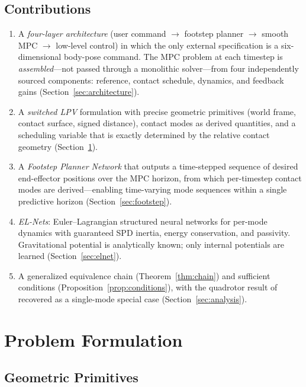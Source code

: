 \documentclass[letterpaper, 10pt, conference]{IEEEtran}
\begin{document}
\subsection*{Contributions}
\begin{enumerate}
  \item A \emph{four-layer architecture} (user command $\to$
    footstep planner $\to$ smooth MPC $\to$ low-level control)
    in which the only external specification is a six-dimensional
    body-pose command.
    The MPC problem at each timestep is \emph{assembled}---not
    passed through a monolithic solver---from four independently
    sourced components: reference, contact schedule, dynamics,
    and feedback gains (Section~\ref{sec:architecture}).
  \item A \emph{switched LPV} formulation with precise geometric
    primitives (world frame, contact surface, signed distance),
    contact modes as derived quantities, and a scheduling variable
    that is exactly determined by the relative contact geometry
    (Section~\ref{sec:formulation}).
  \item A \emph{Footstep Planner Network} that outputs a
    time-stepped sequence of desired end-effector positions
    over the MPC horizon, from which per-timestep contact modes
    are derived---enabling time-varying mode sequences within
    a single predictive horizon (Section~\ref{sec:footstep}).
  \item \emph{EL-Nets}: Euler--Lagrangian structured neural networks
    for per-mode dynamics with guaranteed SPD inertia, energy
    conservation, and passivity.
    Gravitational potential is analytically known; only internal
    potentials are learned (Section~\ref{sec:elnet}).
  \item A generalized equivalence chain (Theorem~\ref{thm:chain})
    and sufficient conditions (Proposition~\ref{prop:conditions}),
    with the quadrotor result of~\cite{zhang2025flat} recovered
    as a single-mode special case (Section~\ref{sec:analysis}).
\end{enumerate}

\section{Problem Formulation}\label{sec:formulation}

\subsection{Geometric Primitives}\label{sec:geometry}
\end{document}
